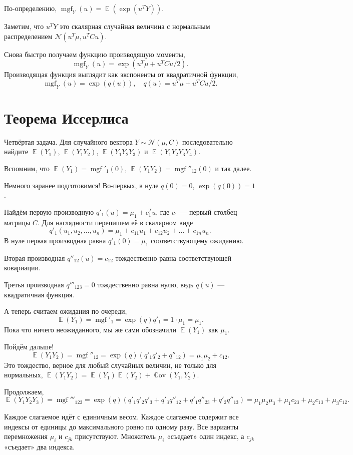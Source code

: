 \documentclass[12pt]{article}
\DeclareMathOperator{\Cov}{\mathbb{C}ov}
\DeclareMathOperator{\E}{\mathbb{E}}
\DeclareMathOperator{\mgf}{mgf}
\newcommand{\cN}{\mathcal{N}}
\begin{document}
По-определению, $\mgf_Y(u) = \E(\exp(u^T Y))$.

Заметим, что $u^T Y$ это скалярная случайная величина с нормальным распределением $\cN(u^T \mu, u^T C u)$.

Снова быстро получаем функцию производящую моменты, 
\[
\mgf_Y(u) = \exp(u^T\mu + u^T C u/2).
\]
Производящая функция выглядит как экспоненты от квадратичной функции,
\[
\mgf_Y(u) = \exp(q(u)), \quad q(u) = u^T\mu + u^T C u/2.
\]

\section*{Теорема Иссерлиса}
Четвёртая задача. 
Для случайного вектора $Y \sim \cN(\mu, C)$ последовательно найдите $\E(Y_1)$, $\E(Y_1 Y_2)$, $\E(Y_1 Y_2 Y_3)$ и $\E(Y_1 Y_2 Y_3 Y_4)$.

Вспомним, что $\E(Y_1) = \mgf'_1(0)$, $\E(Y_1 Y_2) = \mgf''_{12}(0)$ и так далее. 

Немного заранее подготовимся! Во-первых, в нуле $q(0) = 0$, $\exp(q(0)) = 1$.

Найдём первую производную $q'_1(u) = \mu_1 + c_1^T u$, где $c_1$ — первый столбец матрицы $C$.
Для наглядности перепишем её в скалярном виде
\[
    q'_1(u_1, u_2, \dots, u_n) = \mu_1 + c_{11}u_1 + c_{12}u_2 + \dots + c_{1n}u_n.
\]
В нуле первая производная равна $q'_1(0) = \mu_1$ соответствующему ожиданию. 

Вторая производная $q''_{12}(u) = c_{12}$ тождественно равна соответствующей ковариации. 

Третья производная $q'''_{123} = 0$  тождественно равна нулю, ведь $q(u)$ — квадратичная функция.

А теперь считаем ожидания по очереди,
\[
    \E(Y_1) = \mgf'_1 = \exp(q) q'_1 = 1 \cdot \mu_1 = \mu_1.
\]
Пока что ничего неожиданного, мы же сами обозначили $\E(Y_1)$ как $\mu_1$.

Пойдём дальше!
\[
    \E(Y_1Y_2) = \mgf''_{12} = \exp(q) (q'_1q'_2 + q''_{12}) = \mu_1 \mu_2 + c_{12}.
\]
Это тождество, верное для любый случайных величин, не только для нормальных, $\E(Y_1 Y_2) = \E(Y_1) \E(Y_2) + \Cov(Y_1, Y_2)$.

Продолжаем,
\[
    \E(Y_1 Y_2 Y_3) = \mgf'''_{123} = \exp(q) (q'_1 q'_2 q'_3 + q'_3 q''_{12} + q'_1 q''_{23} + q'_2 q''_{13}) = \mu_1 \mu_2\mu_3 + \mu_1 c_{23} + \mu_2 c_{13} + \mu_3 c_{12}.
\]
\begin{tcolorbox}[colback=yellow!50!red!25!white]
Каждое слагаемое идёт с единичным весом.
Каждое слагаемое содержит все индексы от единицы до максимального ровно по одному разу. 
Все варианты перемножения $\mu_i$ и $c_{jk}$ присутствуют. 
Множитель $\mu_i$ «съедает» один индекс, а $c_{jk}$ «съедает» два индекса. 
\end{tcolorbox}
\end{document}
